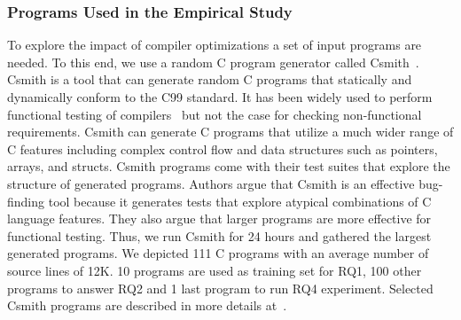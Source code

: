 \subsubsection{Programs Used in the Empirical Study}
To explore the impact of compiler optimizations a set of input programs are needed. 
To this end, we use a random C program generator called Csmith~\cite{yang2011finding}.
Csmith is a tool that can generate random C programs that statically and dynamically conform to the C99 standard. It has been widely used to perform functional testing of compilers~\cite{chen2016empirical,le2014compiler,nagai2013scaling} but not the case for checking non-functional requirements. Csmith can generate C programs that utilize a much wider range of C features including complex control flow and data structures such as pointers, arrays, and structs. Csmith programs come with their test suites that explore the structure of generated programs. 
Authors argue that Csmith is an effective bug-finding tool because it generates tests that explore atypical combinations of C language features. They also argue that larger programs are more effective for functional testing. Thus, we run Csmith for 24 hours and gathered the largest generated programs. We depicted 111 C programs with an average number of source lines of 12K. 10 programs are used as training set for RQ1, 100 other programs to answer RQ2 and 1 last program to run RQ4 experiment.
Selected Csmith programs are described in more details at~\cite{mboussaa}.

